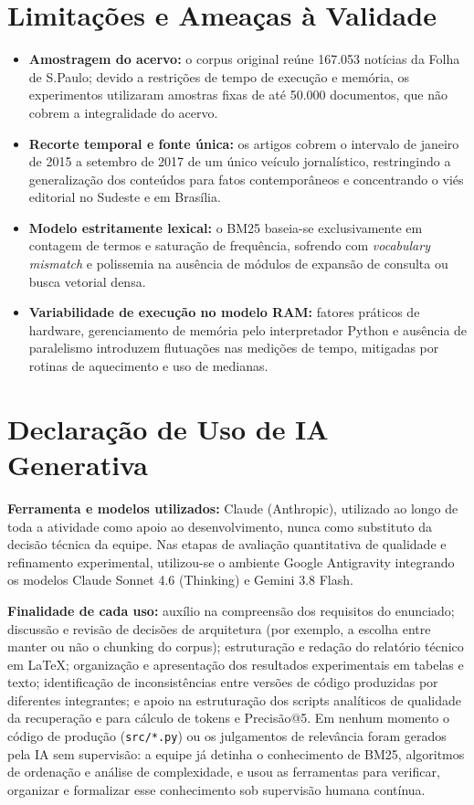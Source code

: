 \documentclass[12pt, a4paper]{article}
\begin{document}
\section{Limitações e Ameaças à Validade}

\begin{itemize}
    \item \textbf{Amostragem do acervo:} o corpus original reúne 167.053 notícias da Folha de S.Paulo; devido a restrições de tempo de execução e memória, os experimentos utilizaram amostras fixas de até 50.000 documentos, que não cobrem a integralidade do acervo.
    \item \textbf{Recorte temporal e fonte única:} os artigos cobrem o intervalo de janeiro de 2015 a setembro de 2017 de um único veículo jornalístico, restringindo a generalização dos conteúdos para fatos contemporâneos e concentrando o viés editorial no Sudeste e em Brasília.
    \item \textbf{Modelo estritamente lexical:} o BM25 baseia-se exclusivamente em contagem de termos e saturação de frequência, sofrendo com \textit{vocabulary mismatch} e polissemia na ausência de módulos de expansão de consulta ou busca vetorial densa.
    \item \textbf{Variabilidade de execução no modelo RAM:} fatores práticos de hardware, gerenciamento de memória pelo interpretador Python e ausência de paralelismo introduzem flutuações nas medições de tempo, mitigadas por rotinas de aquecimento e uso de medianas.
\end{itemize}

\section{Declaração de Uso de IA Generativa}

\textbf{Ferramenta e modelos utilizados:} Claude (Anthropic), utilizado ao longo de toda a atividade como apoio ao desenvolvimento, nunca como substituto da decisão técnica da equipe. Nas etapas de avaliação quantitativa de qualidade e refinamento experimental, utilizou-se o ambiente Google Antigravity integrando os modelos Claude Sonnet 4.6 (Thinking) e Gemini 3.8 Flash.

\textbf{Finalidade de cada uso:} auxílio na compreensão dos requisitos do enunciado; discussão e revisão de decisões de arquitetura (por exemplo, a escolha entre manter ou não o chunking do corpus); estruturação e redação do relatório técnico em LaTeX; organização e apresentação dos resultados experimentais em tabelas e texto; identificação de inconsistências entre versões de código produzidas por diferentes integrantes; e apoio na estruturação dos scripts analíticos de qualidade da recuperação e para cálculo de tokens e Precisão@5. Em nenhum momento o código de produção (\texttt{src/*.py}) ou os julgamentos de relevância foram gerados pela IA sem supervisão: a equipe já detinha o conhecimento de BM25, algoritmos de ordenação e análise de complexidade, e usou as ferramentas para verificar, organizar e formalizar esse conhecimento sob supervisão humana contínua.
\end{document}
